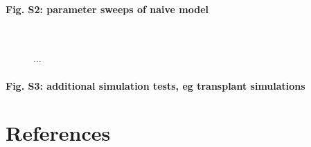\documentclass[review]{elsarticle}
\begin{document}
\paragraph{Fig. S2: parameter sweeps of naive model}
\begin{figure}
\centering
{}\quad
{}\\
\caption{... \label{figNaiveModelSweeps}}
\end{figure}

\paragraph{Fig. S3: additional simulation tests, eg transplant simulations}

\section*{References}

\end{document}
